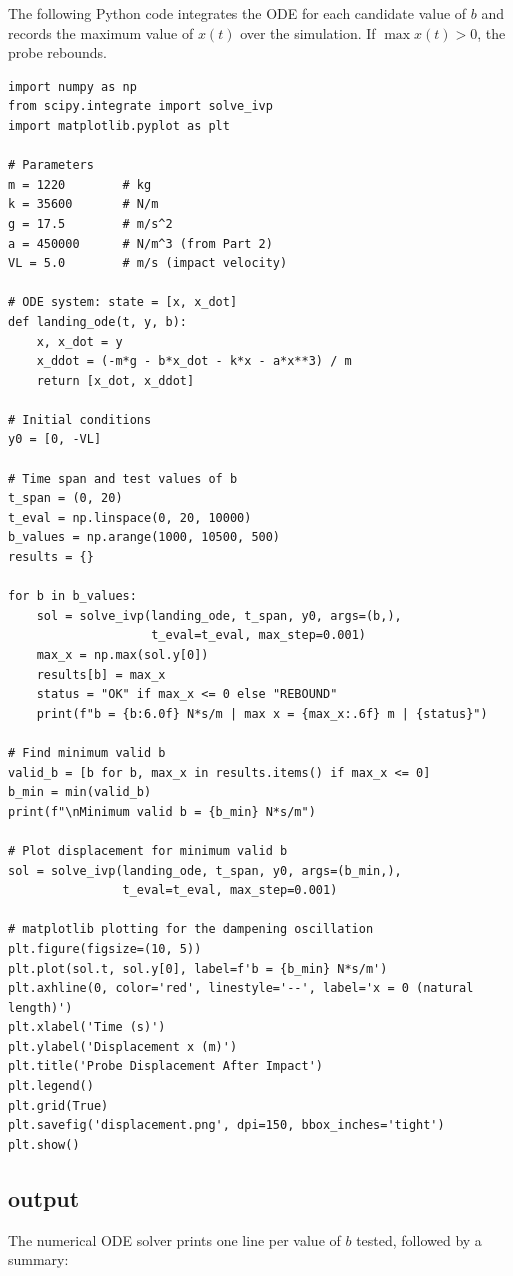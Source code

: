 \documentclass[12pt]{article}
\begin{document}
The following Python code integrates the ODE for each candidate value of $b$ and records
the maximum value of $x(t)$ over the simulation. If $\max x(t) > 0$, the probe rebounds.

\begin{lstlisting}[caption={Numerical search for minimum damping coefficient $b$}]
import numpy as np
from scipy.integrate import solve_ivp
import matplotlib.pyplot as plt

# Parameters
m = 1220        # kg
k = 35600       # N/m
g = 17.5        # m/s^2
a = 450000      # N/m^3 (from Part 2)
VL = 5.0        # m/s (impact velocity)

# ODE system: state = [x, x_dot]
def landing_ode(t, y, b):
    x, x_dot = y
    x_ddot = (-m*g - b*x_dot - k*x - a*x**3) / m
    return [x_dot, x_ddot]

# Initial conditions
y0 = [0, -VL]

# Time span and test values of b
t_span = (0, 20)
t_eval = np.linspace(0, 20, 10000)
b_values = np.arange(1000, 10500, 500)
results = {}

for b in b_values:
    sol = solve_ivp(landing_ode, t_span, y0, args=(b,),
                    t_eval=t_eval, max_step=0.001)
    max_x = np.max(sol.y[0])
    results[b] = max_x
    status = "OK" if max_x <= 0 else "REBOUND"
    print(f"b = {b:6.0f} N*s/m | max x = {max_x:.6f} m | {status}")

# Find minimum valid b
valid_b = [b for b, max_x in results.items() if max_x <= 0]
b_min = min(valid_b)
print(f"\nMinimum valid b = {b_min} N*s/m")

# Plot displacement for minimum valid b
sol = solve_ivp(landing_ode, t_span, y0, args=(b_min,),
                t_eval=t_eval, max_step=0.001)

# matplotlib plotting for the dampening oscillation
plt.figure(figsize=(10, 5))
plt.plot(sol.t, sol.y[0], label=f'b = {b_min} N*s/m')
plt.axhline(0, color='red', linestyle='--', label='x = 0 (natural length)')
plt.xlabel('Time (s)')
plt.ylabel('Displacement x (m)')
plt.title('Probe Displacement After Impact')
plt.legend()
plt.grid(True)
plt.savefig('displacement.png', dpi=150, bbox_inches='tight')
plt.show()
\end{lstlisting}

\subsection{output}

The numerical ODE solver prints one line per value of $b$ tested, followed by a summary:
\end{document}
